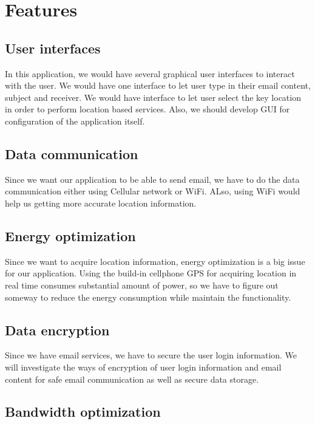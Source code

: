 \documentclass[a4paper,12pt]{article}
\begin{document}
	
	\section{Features}
	\subsection{User interfaces}
	
	In this application, we would have several graphical user interfaces to interact with the user. We would have one interface to let user type in their email content, subject and receiver. We would have interface to let user select the key location in order to perform location based services. Also, we should develop GUI for configuration of the application itself.
	
	\subsection{Data communication}
	
	Since we want our application to be able to send email, we have to do the data communication either using Cellular network or WiFi. ALso, using WiFi would help us getting more accurate location information.
	
	\subsection{Energy optimization}
	
	Since we want to acquire location information, energy optimization is a big issue for our application. Using the build-in cellphone GPS for acquiring location in real time consumes substantial amount of power, so we have to figure out someway to reduce the energy consumption while maintain the functionality.
	
	\subsection{Data encryption}
	
	Since we have email services, we have to secure the user login information. We will investigate the ways of encryption of user login information and email content for safe email communication as well as secure data storage.
	
	\subsection{Bandwidth optimization}
	
	
	
	
	
	
	
	
	
\end{document}
